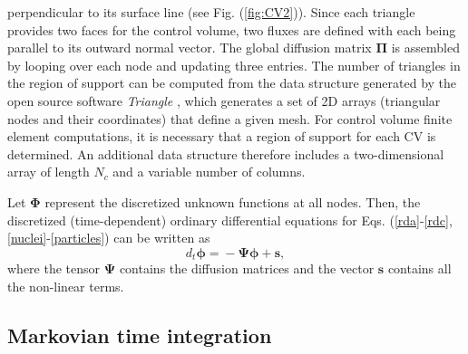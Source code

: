 \documentclass[aps,preprint]{revtex4}
\begin{document}
perpendicular to its surface line (see Fig. (\ref{fig:CV2})). Since each
triangle provides two faces for the control volume, two fluxes are defined
with each being parallel to its outward normal vector. The global diffusion
matrix $\mathbf{\Pi}$ is assembled by looping over each node and updating
three entries. The number of triangles in the region of support can be
computed from the data structure generated by the open source software
\textit{Triangle }\cite{Triangle}, which generates a set of 2D arrays
(triangular nodes and their coordinates) that define a given mesh. For control
volume finite element computations, it is necessary that a region of support for
each CV is determined. An additional data structure therefore includes a
two-dimensional array of length $N_{c}$ and a variable number of columns.

Let $\mathbf{\Phi}$ represent the discretized unknown functions at all nodes.
Then, the discretized (time-dependent) ordinary differential equations for
Eqs. (\ref{rda}-\ref{rdc},\ref{nuclei}-\ref{particles}) can be written as
\begin{equation}
d_{t}\mathbf{\phi=}-\mathbf{\Psi\phi+s,}\label{ODEs}%
\end{equation}
where the tensor $\mathbf{\Psi}$ contains the diffusion matrices and the
vector $\mathbf{s}$ contains all the non-linear terms.

\subsection{Markovian time integration}
\end{document}
